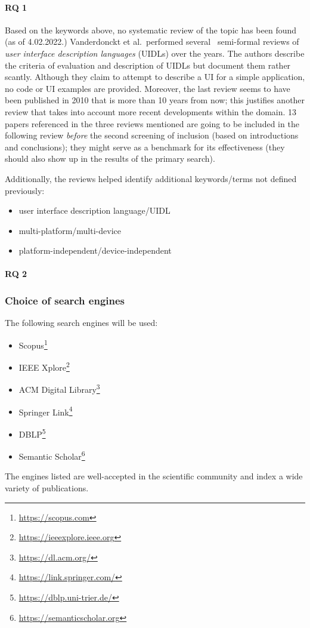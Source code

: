 \paragraph{RQ 1}
Based on the keywords above, no systematic review of the topic has been found (as of 4.02.2022.)
Vanderdonckt et al.\ performed several~\cite{souchon_review_2003,guerrero_garcia_theoretical_2009,guerrero_garcia_theoretical_2011}
semi-formal reviews of \emph{user interface description languages} (UIDLs) over the years.
The authors describe the criteria of evaluation and description of UIDLs but document them rather scantly.
Although they claim to attempt to describe a UI for a simple application, no code or UI examples are provided.
Moreover, the last review seems to have been published in 2010 \textendash that is more than 10 years from now;
this justifies another review that takes into account more recent developments within the domain.
13 papers referenced in the three reviews mentioned are going to be included in the following review
\emph{before} the second screening of inclusion (based on introductions and conclusions);
they might serve as a benchmark for its effectiveness (they should also show up in the results of the primary search).

Additionally, the reviews helped identify additional keywords/terms not defined previously:
\begin{itemize}
    \item user interface description language/UIDL
    \item multi-platform/multi-device
    \item platform-independent/device-independent
\end{itemize}

\paragraph{RQ 2}

\subsubsection{Choice of search engines}

The following search engines will be used:
\begin{itemize}
    \item Scopus\footnote{\url{https://scopus.com}}
    \item IEEE Xplore\footnote{\url{https://ieeexplore.ieee.org}}
    \item ACM Digital Library\footnote{\url{https://dl.acm.org/}}
    \item Springer Link\footnote{\url{https://link.springer.com/}}
    \item DBLP\footnote{\url{https://dblp.uni-trier.de/}}
    \item Semantic Scholar\footnote{\url{https://semanticscholar.org}}
\end{itemize}
The engines listed are well-accepted in the scientific community and index a wide variety of publications.

